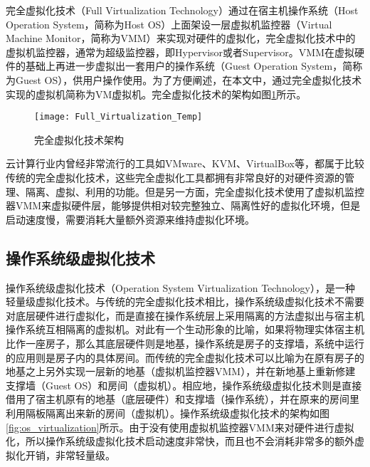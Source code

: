 完全虚拟化技术（Full Virtualization Technology）通过在宿主机操作系统（Host Operation System，简称为Host OS）上面架设一层虚拟机监控器（Virtual Machine Monitor，简称为VMM）\citep{li2017performance}来实现对硬件的虚拟化，完全虚拟化技术中的虚拟机监控器，通常为超级监控器，即Hypervisor或者Supervisor\citep{kolhe2012comparative}\citep{leite2012performance}。VMM在虚拟硬件的基础上再进一步虚拟出一套用户的操作系统（Guest Operation System，简称为Guest OS），供用户操作使用。为了方便阐述，在本文中，通过完全虚拟化技术实现的虚拟机简称为VM虚拟机。完全虚拟化技术的架构如图\ref{fig:full_virtualization}所示\citep{oludele2014evolution}。

\begin{figure}[!htbp]
    \centering
    \texttt{[image: Full\_Virtualization\_Temp]}
    \caption{完全虚拟化技术架构}
    \label{fig:full_virtualization}
\end{figure}

云计算行业内曾经非常流行的工具如VMware\citep{sahasrabudhe2014comparing}\cite{li2010selecting}、KVM\citep{liu2014research}、VirtualBox\citep{li2010selecting}等，都属于比较传统的完全虚拟化技术，这些完全虚拟化工具都拥有非常良好的对硬件资源的管理、隔离、虚拟、利用的功能。但是另一方面，完全虚拟化技术使用了虚拟机监控器VMM来虚拟硬件层，能够提供相对较完整独立、隔离性好的虚拟化环境，但是启动速度慢，需要消耗大量额外资源来维持虚拟化环境。

\subsection{操作系统级虚拟化技术}

操作系统级虚拟化技术（Operation System Virtualization Technology），是一种轻量级虚拟化技术\citep{morabito2017virtualization}。与传统的完全虚拟化技术相比，操作系统级虚拟化技术不需要对底层硬件进行虚拟化，而是直接在操作系统层上采用隔离的方法虚拟出与宿主机操作系统互相隔离的虚拟机。对此有一个生动形象的比喻，如果将物理实体宿主机比作一座房子，那么其底层硬件则是地基，操作系统是房子的支撑墙，系统中运行的应用则是房子内的具体房间。而传统的完全虚拟化技术可以比喻为在原有房子的地基之上另外实现一层新的地基（虚拟机监控器VMM），并在新地基上重新修建支撑墙（Guest OS）和房间（虚拟机）。相应地，操作系统级虚拟化技术则是直接借用了宿主机原有的地基（底层硬件）和支撑墙（操作系统），并在原来的房间里利用隔板隔离出来新的房间（虚拟机）。操作系统级虚拟化技术的架构如图\ref{fig:os_virtualization}所示\citep{xavier2013performance}。由于没有使用虚拟机监控器VMM来对硬件进行虚拟化，所以操作系统级虚拟化技术启动速度非常快，而且也不会消耗非常多的额外虚拟化开销，非常轻量级\citep{babu2014system}。

